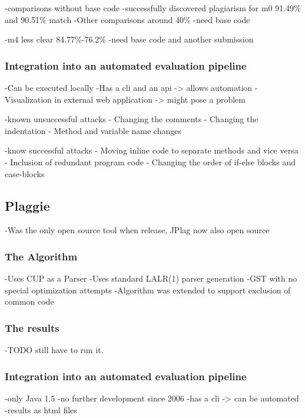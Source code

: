 \documentclass[a4paper, 11pt]{article}
\renewcommand{\\}{\vspace*{0.5\baselineskip} \newline}
\begin{document}
-comparisons without base code
-successfully discovered plagiarism for m0 91.49\% and 90.51\% match
-Other comparisons around 40\%
-need base code

-m4 less clear 84.77\%-76.2\%
-need base code and another submission

\subsubsection{Integration into an automated evaluation pipeline}

-Can be executed locally
-Has a cli and an api -> allows automation
-Visualization in external web application -> might pose a problem

-known unsuccessful attacks
- Changing the comments
- Changing the indentation
- Method and variable name changes\autocite[Known successful attacks]{RMP}

-know successful attacks
- Moving inline code to separate methods and vice versa
- Inclusion of redundant program code
- Changing the order of if-else blocks and case-blocks\autocite[Known unsuccessful attacks]{RMP}

\subsection{Plaggie}

-Was the only open source tool when release\autocite{PLAGGIE}, JPlag now also open source

\subsubsection{The Algorithm}

-Uses CUP as a Parser
-Uses standard LALR(1) parser generation\autocite{CUP}
-GST with no special optimization attempts
-Algorithm was extended to support exclusion of common code\autocite[4. Algorithm used]{RMP}

\subsubsection{The results}

-TODO still have to run it.

\subsubsection{Integration into an automated evaluation pipeline}

-only Java 1.5\autocite{PLAGGIE,RMP}
-no further development since 2006
-has a cli -> can be automated
-results as html files
\end{document}
